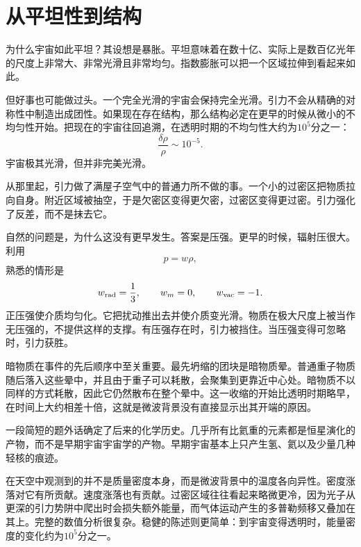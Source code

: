 \begin{classroomqa}
\end{classroomqa}

\section{从平坦性到结构}

为什么宇宙如此平坦？其设想是暴胀。平坦意味着在数十亿、实际上是数百亿光年的尺度上非常大、非常光滑且非常均匀。指数膨胀可以把一个区域拉伸到看起来如此。

但好事也可能做过头。一个完全光滑的宇宙会保持完全光滑。引力不会从精确的对称性中制造出成团性。如果现在存在结构，那么结构必定在更早的时候从微小的不均匀性开始。把现在的宇宙往回追溯，在透明时期的不均匀性大约为\(10^5\)分之一：
\begin{equation}
\frac{\delta\rho}{\rho}\sim 10^{-5}.
\end{equation}
宇宙极其光滑，但并非完美光滑。

从那里起，引力做了满屋子空气中的普通力所不做的事。一个小的过密区把物质拉向自身。附近区域被抽空，于是欠密区变得更欠密，过密区变得更过密。引力强化了反差，而不是抹去它。

自然的问题是，为什么这没有更早发生。答案是压强。更早的时候，辐射压很大。利用
\begin{equation}
p=w\rho,
\end{equation}
熟悉的情形是
\begin{equation}
w_{\rm rad}=\frac13,\qquad
w_m=0,\qquad
w_{\rm vac}=-1.
\end{equation}
正压强使介质均匀化。它把扰动推出去并使介质变光滑。物质在极大尺度上被当作无压强的，不提供这样的支撑。有压强存在时，引力被挡住。当压强变得可忽略时，引力获胜。

暗物质在事件的先后顺序中至关重要。最先坍缩的团块是暗物质晕。普通重子物质随后落入这些晕中，并且由于重子可以耗散，会聚集到更靠近中心处。暗物质不以同样的方式耗散，因此它仍然散布在整个晕中。这一收缩的开始比透明时期略早，在时间上大约相差十倍，这就是微波背景没有直接显示出其开端的原因。

一段简短的题外话确定了后来的化学历史。几乎所有比氦重的元素都是恒星演化的产物，而不是早期宇宙宇宙学的产物。早期宇宙基本上只产生氢、氦以及少量几种轻核的痕迹。

在天空中观测到的并不是质量密度本身，而是微波背景中的温度各向异性。密度涨落对它有所贡献。速度涨落也有贡献。过密区域往往看起来略微更冷，因为光子从更深的引力势阱中爬出时会损失额外能量，而气体运动产生的多普勒频移又叠加在其上。完整的数值分析很复杂。稳健的陈述则更简单：到宇宙变得透明时，能量密度的变化约为\(10^5\)分之一。


